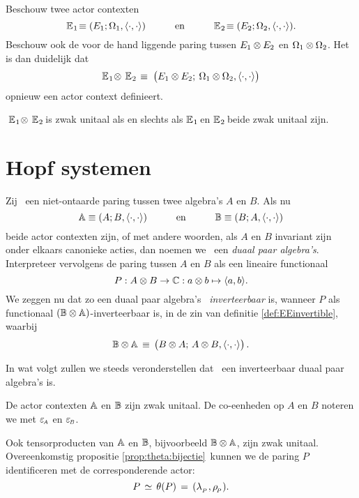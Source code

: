 \documentclass{book}
\begin{document}
\begin{defn} \rm
Beschouw twee actor contexten
$$ \EEone \equiv (E_1; \Om_1,\pairing)
         \andspace{3em}
   \EEtwo \equiv (E_2; \Om_2,\pairing). $$
Beschouw ook de voor de hand liggende paring tussen $E_1 \tens E_2$ en $\Om_1 \tens \Om_2$.
Het is dan duidelijk dat
$$\EEone \tens\, \EEtwo    \;\equiv\;
          \left(E_1 \tens E_2; \:\Om_1 \tens \Om_2, \pairing\vertM\right)$$
opnieuw een actor context definieert.
\end{defn}


\begin{lemma}
$\;\EEone \tens\, \EEtwo$ is zwak unitaal als en slechts als\/ $\EEone$ en\/ $\EEtwo$
beide zwak unitaal zijn.
\end{lemma}




\section{Hopf systemen}

\begin{defn} \rm
Zij \pairing\ een niet-ontaarde paring tussen twee algebra's $A$ en $B$\@.
Als nu
$$ \Aa \equiv (A; B, \pairing)   \andspace{3em}
   \BB \equiv (B; A, \pairing) $$
beide actor contexten zijn, of met andere woorden, als $A$ en $B$ invariant zijn onder
elkaars canonieke acties, dan noemen we \pairAB\ een {\em duaal paar algebra's}\@.
Interpreteer vervolgens de paring tussen $A$ en $B$ als een lineaire functionaal
$$ P : A \tens B \rarr \kk: a \tens b \mapsto \pair{a}{b}. $$
We zeggen nu dat zo een duaal paar algebra's \pairAB\ {\em inverteerbaar\/} is, wanneer $P$ als
functionaal $(\BBAA)$-inverteerbaar is, in de zin van definitie \ref{def:EEinvertible},
waarbij
$$ \BBAA  \,\equiv\,  \left(\vertM  B \tens A; \, A \tens B, \pairing \right). $$
\end{defn}


In wat volgt zullen we steeds veronderstellen dat \pairAB\ een
inverteerbaar duaal paar algebra's is.

\begin{lemma}
De actor contexten\/ $\Aa$ en\/ $\BB$ zijn zwak unitaal.
\rm De co-eenheden op $A$ en $B$ noteren we met $\epsA$ en $\epsB$.
\end{lemma}


\begin{cor}
Ook tensorproducten van $\Aa$ en\/ $\BB$, bijvoorbeeld\/ $\BBAA$, zijn zwak unitaal.
Overeenkomstig propositie \ref{prop:theta:bijectie}\ kunnen we de paring\/ $P$ identificeren
met de corresponderende actor:
$$ P \,\simeq\, \theta(\pr) \,=\, (\lp\,,\rp).  $$
\end{cor}
\end{document}
